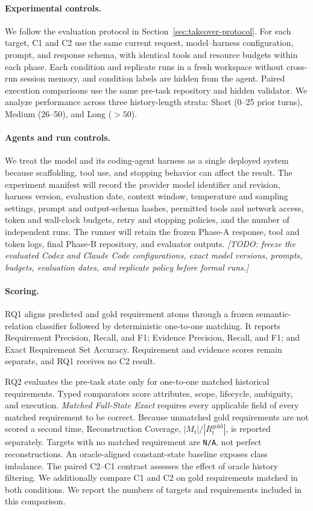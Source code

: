 \documentclass{article} %
\newcommand{\placeholder}[1]{\emph{[#1]}}
\begin{document}
\paragraph{Experimental controls.}
We follow the evaluation protocol in Section~\ref{sec:takeover-protocol}. For each target, C1 and C2 use the same current request, model--harness configuration, prompt, and response schema, with identical tools and resource budgets within each phase. Each condition and replicate runs in a fresh workspace without cross-run session memory, and condition labels are hidden from the agent. Paired execution comparisons use the same pre-task repository and hidden validator. We analyze performance across three history-length strata: Short (0--25 prior turns), Medium (26--50), and Long ($>50$).
\paragraph{Agents and run controls.}
We treat the model and its coding-agent harness as a single deployed system because scaffolding, tool use, and stopping behavior can affect the result. The experiment manifest will record the provider model identifier and revision, harness version, evaluation date, context window, temperature and sampling settings, prompt and output-schema hashes, permitted tools and network access, token and wall-clock budgets, retry and stopping policies, and the number of independent runs. The runner will retain the frozen Phase-A response, tool and token logs, final Phase-B repository, and evaluator outputs.
\placeholder{TODO: freeze the evaluated Codex and Claude Code configurations, exact model versions, prompts, budgets, evaluation dates, and replicate policy before formal runs.}

\paragraph{Scoring.}
RQ1 aligns predicted and gold requirement atoms through a frozen semantic-relation classifier followed by deterministic one-to-one matching. It reports Requirement Precision, Recall, and F1; Evidence Precision, Recall, and F1; and Exact Requirement Set Accuracy. Requirement and evidence scores remain separate, and RQ1 receives no C2 result.

RQ2 evaluates the pre-task state only for one-to-one matched historical requirements. Typed comparators score attributes, scope, lifecycle, ambiguity, and execution. \emph{Matched Full-State Exact} requires every applicable field of every matched requirement to be correct. Because unmatched gold requirements are not scored a second time, Reconstruction Coverage, $|M_t|/|R_t^{\mathrm{gold}}|$, is reported separately. Targets with no matched requirement are \texttt{N/A}, not perfect reconstructions. An oracle-aligned constant-state baseline exposes class imbalance. The paired C2--C1 contrast assesses the effect of oracle history filtering. We additionally compare C1 and C2 on gold requirements matched in both conditions. We report the numbers of targets and requirements included in this comparison.
\end{document}
